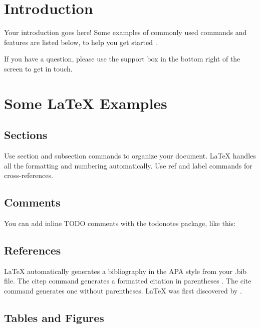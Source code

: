 



\section{Introduction}

Your introduction goes here! Some examples \citet{Shih2013} of commonly \citep{Shih2013} used commands and features are listed below, to help you get started \citep{Shih2013, Ophir2009}.

If you have a question, please use the support box in the bottom right of the screen to get in touch. 

\section{Some \LaTeX{} Examples}
\label{sec:examples}

\subsection{Sections}

Use section and subsection commands to organize your document. \LaTeX{} handles all the formatting and numbering automatically. Use ref and label commands for cross-references.

\subsection{Comments}

You can add inline TODO comments with the todonotes package, like this:

\subsection{References}

LaTeX automatically generates a bibliography in the APA style from your .bib file. The citep command generates a formatted citation in parentheses \citep{Shih2013}. The cite command generates one without parentheses. LaTeX was first discovered by \cite{Shih2013}.

\subsection{Tables and Figures}

